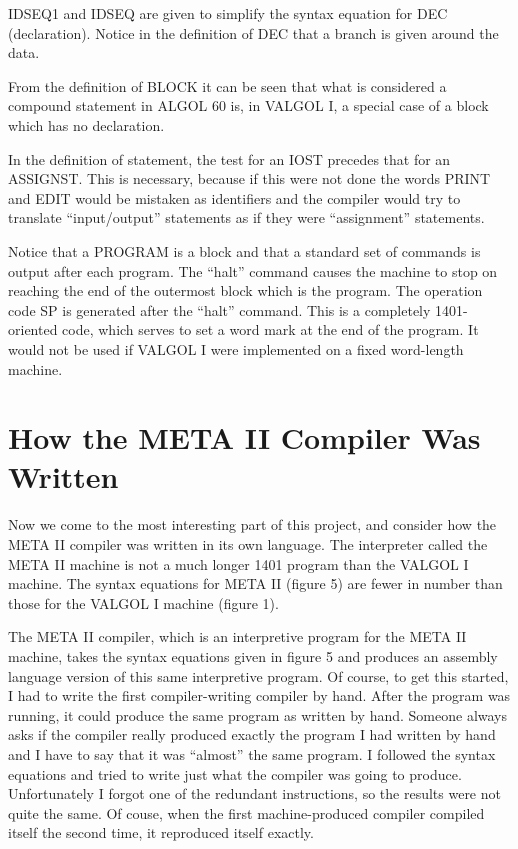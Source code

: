 \documentclass[twocolumn]{article}
\begin{document}
IDSEQ1 and IDSEQ are given to simplify the syntax equation for DEC (declaration).
Notice in the definition of DEC that a branch is given around the data.

From the definition of BLOCK it can be seen that what is considered a compound
statement in ALGOL 60 is, in VALGOL I, a special case of a block which has no
declaration.

In the definition of statement, the test for an IOST precedes that for an
ASSIGNST.
This is necessary, because if this were not done the words PRINT and EDIT
would be mistaken as identifiers and the compiler would try to translate
``input/output'' statements as if they were ``assignment'' statements.

Notice that a PROGRAM is a block and that a standard set of commands is output
after each program.
The ``halt'' command causes the machine to stop on reaching the end of the
outermost block which is the program.
The operation code SP is generated after the ``halt'' command.
This is a completely 1401-oriented code, which serves to set a word mark
at the end of the program.
It would not be used if VALGOL I were implemented on a fixed word-length machine.

\section{How the META II Compiler Was Written}

Now we come to the most interesting part of this project, and consider how the
META II compiler was written in its own language.
The interpreter called the META II machine is not a much longer 1401 program
than the VALGOL I machine.
The syntax equations for META II (figure 5) are fewer in number than those
for the VALGOL I machine (figure 1).

The META II compiler, which is an interpretive program for the META II
machine, takes the syntax equations given in figure 5 and produces an
assembly language version of this same interpretive program.
Of course, to get this started, I had to write the first compiler-writing
compiler by hand.
After the program was running, it could produce the same program as written
by hand.
Someone always asks if the compiler really produced exactly the program I
had written by hand and I have to say that it was ``almost'' the same
program.
I followed the syntax equations and tried to write just what the compiler
was going to produce.
Unfortunately I forgot one of the redundant instructions, so the results
were not quite the same.
Of couse, when the first machine-produced compiler compiled itself
the second time, it reproduced itself exactly.
\end{document}
